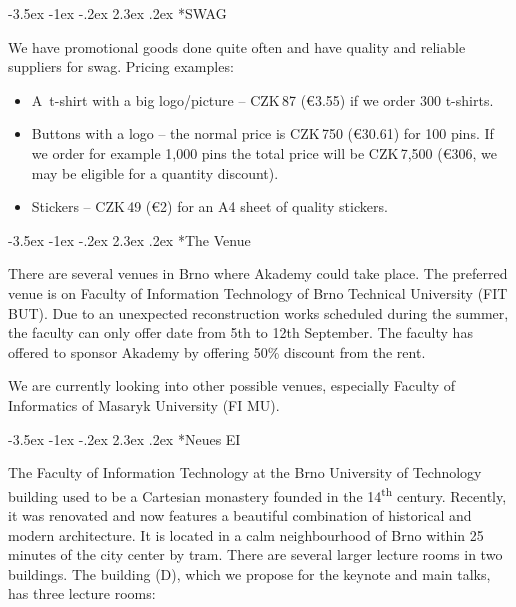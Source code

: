 \documentclass[10pt,a4paper]{article}
\makeatletter
\renewcommand\section{%
\@startsection{section}{1}{\z@}%
              {-3.5ex \@plus -1ex \@minus -.2ex}%
              {2.3ex \@plus.2ex}%
              {\color{kdelight}\sffamily\LARGE\bfseries}}
\makeatother
\begin{document}
\cleardoublepage

\section*{SWAG}
We have promotional goods done quite often and have quality and reliable suppliers for swag. Pricing
examples:

\begin{itemize}
\item A~t-shirt with a big logo/picture -- CZK\,87 (\euro{3.55}) if we order 300 t-shirts.
\item Buttons with a logo -- the normal price is CZK\,750 (\euro{30.61}) for 100 pins. If we order for example 
1,000 pins the total price will be CZK\,7,500 (\euro{306}, we may be eligible for a quantity
discount).
\item Stickers -- CZK\,49 (\euro{2}) for an A4 sheet of quality stickers.
\end{itemize}

\cleardoublepage

\section*{The Venue}

There are several venues in Brno where Akademy could take place. The preferred venue is on Faculty of Information Technology of Brno Technical University (FIT BUT). Due to an unexpected reconstruction works scheduled during the summer, the faculty can only offer date from 5th to 12th September. The faculty has offered to sponsor Akademy by offering 50\% discount from the rent.

We are currently looking into other possible venues, especially Faculty of Informatics of Masaryk University (FI MU).

\section*{Neues EI}

\begin{figure}
\vspace{-22pt}
\begin{center}
\end{center}
\vspace{-16pt}
\end{figure}
The \mbox{Faculty} of Information Technology at
the Brno University of \mbox{Technology} building used to be a \mbox{Cartesian} monastery founded in the 14\textsuperscript{th}
century. Recently, it was renovated and now features a beautiful combination of historical and modern
architecture. It is located in a calm neighbourhood of Brno within 25 minutes of the city center by tram.
There are several larger lecture rooms in two buildings. The building (D), which we propose for the keynote and main talks, has three lecture rooms:
\end{document}
